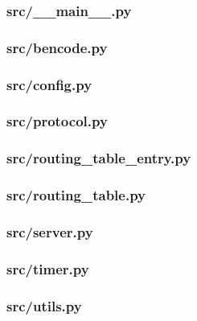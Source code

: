 \documentclass[11pt]{article} %
\begin{document}
\subsubsection{src/\_\_main\_\_.py}


\subsubsection{src/bencode.py}


\subsubsection{src/config.py}


\subsubsection{src/protocol.py}


\subsubsection{src/routing\_table\_entry.py}


\subsubsection{src/routing\_table.py}


\subsubsection{src/server.py}


\subsubsection{src/timer.py}


\subsubsection{src/utils.py}

\end{document}
